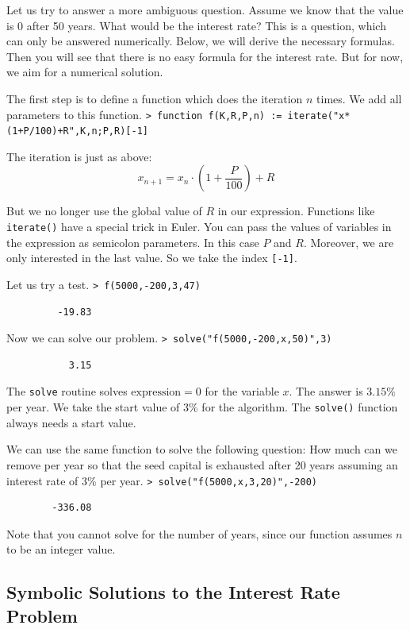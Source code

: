 \documentclass[11pt, a4paper]{article}
\newcommand{\emtcmd}[1]{\noindent\texttt{\textcolor{emtcommand}{>}\ #1}\par\smallskip}
\begin{document}
Let us try to answer a more ambiguous question. Assume we know that the value is 0 after 50 years. What would be the interest rate? This is a question, which can only be answered numerically. Below, we will derive the necessary formulas. Then you will see that there is no easy formula for the interest rate. But for now, we aim for a numerical solution.

The first step is to define a function which does the iteration $n$ times. We add all parameters to this function.
\emtcmd{function f(K,R,P,n) := iterate("x*(1+P/100)+R",K,n;P,R)[-1]}

The iteration is just as above:
$$x_{n+1} = x_n \cdot \left(1+ \frac{P}{100}\right) + R$$

But we no longer use the global value of $R$ in our expression. Functions like \texttt{iterate()} have a special trick in Euler. You can pass the values of variables in the expression as semicolon parameters. In this case $P$ and $R$. Moreover, we are only interested in the last value. So we take the index \texttt{[-1]}.

Let us try a test.
\emtcmd{f(5000,-200,3,47)}
\begin{verbatim}
         -19.83
\end{verbatim}

Now we can solve our problem.
\emtcmd{solve("f(5000,-200,x,50)",3)}
\begin{verbatim}
           3.15
\end{verbatim}

The \texttt{solve} routine solves $\text{expression}=0$ for the variable $x$. The answer is $3.15\%$ per year. We take the start value of $3\%$ for the algorithm. The \texttt{solve()} function always needs a start value.

We can use the same function to solve the following question: How much can we remove per year so that the seed capital is exhausted after 20 years assuming an interest rate of $3\%$ per year.
\emtcmd{solve("f(5000,x,3,20)",-200)}
\begin{verbatim}
        -336.08
\end{verbatim}

Note that you cannot solve for the number of years, since our function assumes $n$ to be an integer value.

\subsection*{Symbolic Solutions to the Interest Rate Problem}
\end{document}
